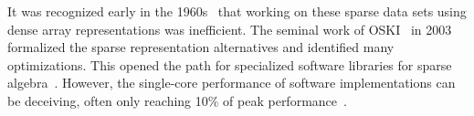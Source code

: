 




It was recognized early in the 1960s~\cite{Saad2003_COO_CSR_DIA_ELL} that working on these sparse data sets using dense array representations was inefficient.
The seminal work of OSKI~\cite{Vuduc2005} in 2003 formalized the sparse representation alternatives and identified many optimizations.
This opened the path for specialized software libraries for sparse algebra~\cite{Williams2007}.
However, the single-core performance of software implementations can be deceiving, often only reaching 10\% of peak performance~\cite{Gale2020}.

%

